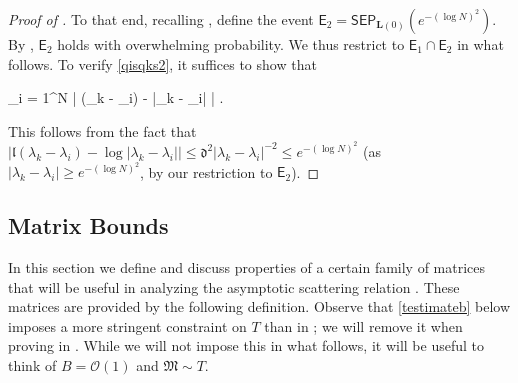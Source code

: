\documentclass{amsart}
\numberwithin{equation}{section}
\theoremstyle{remark}
\theoremstyle{definition}
\begin{document}
\begin{proof}[Proof of ]
		To that end, recalling , define the event $\mathsf{E}_2 = \mathsf{SEP}_{\bm{L}(0)} (e^{-(\log N)^2})$. By , $\mathsf{E}_2$ holds with overwhelming probability. We thus restrict to $\mathsf{E}_1 \cap \mathsf{E}_2$ in what follows. To verify \eqref{qisqks2}, it suffices to show that 
		\begin{flalign*}
			 \displaystyle\sum_{i = 1}^N \big| (\lambda_k - \lambda_i) - \log |\lambda_k - \lambda_i| \big| .
		\end{flalign*} 
		
		\noindent This follows from the fact that $| \mathfrak{l} (\lambda_k - \lambda_i) - \log |\lambda_k - \lambda_i| | \le \mathfrak{d}^2 |\lambda_k - \lambda_i|^{-2} \le e^{-(\log N)^2}$ (as $|\lambda_k - \lambda_i| \ge e^{-(\log N)^2}$, by our restriction to $\mathsf{E}_2$).
	\end{proof} 
	
	
	
	\subsection{Matrix Bounds} 
	
	\label{EstimateMatrix} 
	
	In this section we define and discuss properties of a certain family of matrices that will be useful in analyzing the asymptotic scattering relation . These matrices are provided by the following definition. Observe that \eqref{testimateb} below imposes a more stringent constraint on $T$ than in ; we will remove it when proving  in . While we will not impose this in what follows, it will be useful to think of $B = \mathcal{O}(1)$ and $\mathfrak{M} \sim T$.
	
\end{document}
